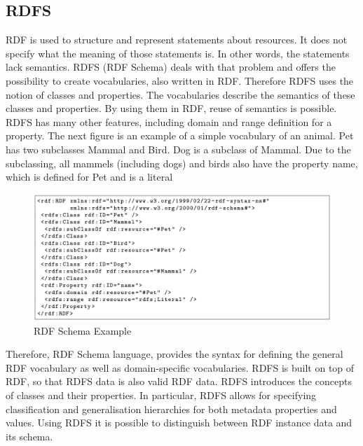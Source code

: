 \documentclass[a4paper,12pt,oneside]{report}
\begin{document}
{{{\subsection {RDFS}
{RDF is used to structure and represent statements about resources. It does not specify what the meaning of those statements is. In other words, the statements lack semantics. RDFS (RDF Schema) deals with that problem and offers the possibility to create vocabularies, also written in RDF. Therefore RDFS uses the notion of classes and properties. The vocabularies describe the semantics of these classes and properties. By using them in RDF, reuse of semantics is possible. RDFS has many other features, including domain and range definition for a property. The next figure is an example of a simple vocabulary of an animal. Pet has two subclasses Mammal and Bird. Dog is a subclass of Mammal. Due to the subclassing, all mammels (including dogs) and birds also have the property name, which is defined for Pet and is a literal}
\begin{figure}[ht]
\centering
\includegraphics[width=1\textwidth]{Capture4}
\caption{RDF Schema Example}
\end{figure}
{Therefore, RDF Schema language, provides the syntax for defining the general RDF vocabulary as well as domain-specific vocabularies. RDFS is built on top of RDF, so that RDFS data is also valid RDF data.  RDFS introduces the concepts of classes and their properties.  In particular, RDFS allows for specifying classification and generalisation hierarchies for both metadata properties and values. Using RDFS it is possible to distinguish between RDF instance data and its schema.}
}}}
\end{document}
